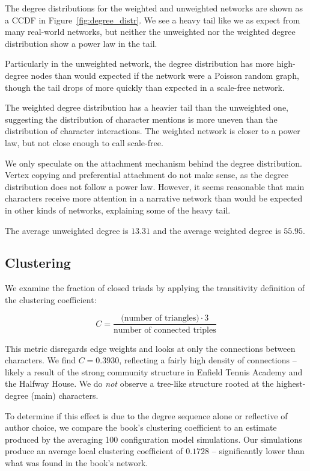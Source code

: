 The degree distributions for the weighted and unweighted networks are shown as a CCDF in Figure~\ref{fig:degree_distr}. We see a heavy tail like we as expect from many real-world networks, but neither the unweighted nor the weighted degree distribution show a power law in the tail. 

Particularly in the unweighted network, the degree distribution has more high-degree nodes than would expected if the network were a Poisson random graph, though the tail drops of more quickly than expected in a scale-free network.

The weighted degree distribution has a heavier tail than the unweighted one, suggesting the distribution of character mentions is more uneven than the distribution of character interactions. The weighted network is closer to a power law, but not close enough to call scale-free.

We only speculate on the attachment mechanism behind the degree distribution. Vertex copying and preferential attachment do not make sense, as the degree distribution does not follow a power law. However, it seems reasonable that main characters receive more attention in a narrative network than would be expected in other kinds of networks, explaining some of the heavy tail.

The average unweighted degree is $13.31$ and the average weighted degree is $55.95$.

\subsection{Clustering}
We examine the fraction of closed triads by applying the transitivity definition of the clustering coefficient:

$$ C = \frac{\text{(number of triangles)} \cdot 3}{\text{number of connected triples}} $$

This metric disregards edge weights and looks at only the connections between characters. We find $C = 0.3930$, reflecting a fairly high density of connections -- likely a result of the strong community structure in Enfield Tennis Academy and the Halfway House. We do \textit{not} observe a tree-like structure rooted at the highest-degree (main) characters.

To determine if this effect is due to the degree sequence alone or reflective of author choice, we compare the book's clustering coefficient to an estimate produced by the averaging 100 configuration model simulations. Our simulations produce an average local clustering coefficient of 0$.1728$ -- significantly lower than what was found in the book's network.

